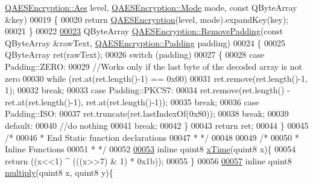 \begin{DoxyCode}
      \hyperlink{class_q_a_e_s_encryption_abe48208f4f6c7d68e6a10b49b9d0b7bd}{QAESEncryption::Aes} level, \hyperlink{class_q_a_e_s_encryption_ad3e031c49a3d56566379d75b40b7b255}{QAESEncryption::Mode} mode, \textcolor{keyword}{const} 
      QByteArray &key)
00019 \{
00020      \textcolor{keywordflow}{return} \hyperlink{class_q_a_e_s_encryption_aeac0ee8532e69e5d30b023fe38c30b3b}{QAESEncryption}(level, mode).expandKey(key);
00021 \}
00022 
\hypertarget{qaesencryption_8cpp_source.tex_l00023}{}\hyperlink{class_q_a_e_s_encryption_abb2887bf5623a74053dd19627f3d3055}{00023} QByteArray \hyperlink{class_q_a_e_s_encryption_abb2887bf5623a74053dd19627f3d3055}{QAESEncryption::RemovePadding}(\textcolor{keyword}{const} QByteArray &rawText, 
      \hyperlink{class_q_a_e_s_encryption_ab0a65cdea4eac21ef32530010d1b0247}{QAESEncryption::Padding} padding)
00024 \{
00025     QByteArray ret(rawText);
00026     \textcolor{keywordflow}{switch} (padding)
00027     \{
00028     \textcolor{keywordflow}{case} Padding::ZERO:
00029         \textcolor{comment}{//Works only if the last byte of the decoded array is not zero}
00030         \textcolor{keywordflow}{while} (ret.at(ret.length()-1) == 0x00)
00031             ret.remove(ret.length()-1, 1);
00032         \textcolor{keywordflow}{break};
00033     \textcolor{keywordflow}{case} Padding::PKCS7:
00034         ret.remove(ret.length() - ret.at(ret.length()-1), ret.at(ret.length()-1));
00035         \textcolor{keywordflow}{break};
00036     \textcolor{keywordflow}{case} Padding::ISO:
00037         ret.truncate(ret.lastIndexOf(0x80));
00038         \textcolor{keywordflow}{break};
00039     \textcolor{keywordflow}{default}:
00040         \textcolor{comment}{//do nothing}
00041         \textcolor{keywordflow}{break};
00042     \}
00043     \textcolor{keywordflow}{return} ret;
00044 \}
00045 \textcolor{comment}{/*}
00046 \textcolor{comment}{ * End Static function declarations}
00047 \textcolor{comment}{ * */}
00048 
00049 \textcolor{comment}{/*}
00050 \textcolor{comment}{ * Inline Functions}
00051 \textcolor{comment}{ * */}
00052 
\hypertarget{qaesencryption_8cpp_source.tex_l00053}{}\hyperlink{qaesencryption_8cpp_a94a5c6f286db021d028ddc6f91a65f72}{00053} \textcolor{keyword}{inline} quint8 \hyperlink{qaesencryption_8cpp_a94a5c6f286db021d028ddc6f91a65f72}{xTime}(quint8 x)\{
00054   \textcolor{keywordflow}{return} ((x<<1) ^ (((x>>7) & 1) * 0x1b));
00055 \}
00056 
\hypertarget{qaesencryption_8cpp_source.tex_l00057}{}\hyperlink{qaesencryption_8cpp_adcc23c7a5520793f14710fff6ef23dfe}{00057} \textcolor{keyword}{inline} quint8 \hyperlink{qaesencryption_8cpp_adcc23c7a5520793f14710fff6ef23dfe}{multiply}(quint8 x, quint8 y)\{

\end{DoxyCode}
